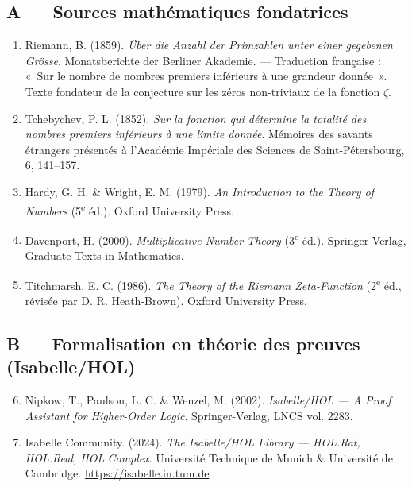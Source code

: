 \documentclass[11pt,a4paper]{article}
\begin{document}
\subsection*{A --- Sources mathématiques fondatrices}

\begin{enumerate}
\item Riemann, B. (1859). \emph{Über die Anzahl der Primzahlen unter einer gegebenen Grösse}. Monatsberichte der Berliner Akademie. --- Traduction française : «~Sur le nombre de nombres premiers inférieurs à une grandeur donnée~». Texte fondateur de la conjecture sur les zéros non-triviaux de la fonction $\zeta$.

\item Tchebychev, P. L. (1852). \emph{Sur la fonction qui détermine la totalité des nombres premiers inférieurs à une limite donnée}. Mémoires des savants étrangers présentés à l'Académie Impériale des Sciences de Saint-Pétersbourg, 6, 141--157.

\item Hardy, G. H. \& Wright, E. M. (1979). \emph{An Introduction to the Theory of Numbers} (5\textsuperscript{e} éd.). Oxford University Press.

\item Davenport, H. (2000). \emph{Multiplicative Number Theory} (3\textsuperscript{e} éd.). Springer-Verlag, Graduate Texts in Mathematics.

\item Titchmarsh, E. C. (1986). \emph{The Theory of the Riemann Zeta-Function} (2\textsuperscript{e} éd., révisée par D. R. Heath-Brown). Oxford University Press.
\end{enumerate}

\subsection*{B --- Formalisation en théorie des preuves (Isabelle/HOL)}

\begin{enumerate}\setcounter{enumi}{5}
\item Nipkow, T., Paulson, L. C. \& Wenzel, M. (2002). \emph{Isabelle/HOL --- A Proof Assistant for Higher-Order Logic}. Springer-Verlag, LNCS vol. 2283.

\item Isabelle Community. (2024). \emph{The Isabelle/HOL Library --- HOL.Rat, HOL.Real, HOL.Complex}. Université Technique de Munich \& Université de Cambridge. \url{https://isabelle.in.tum.de}
\end{enumerate}
\end{document}
